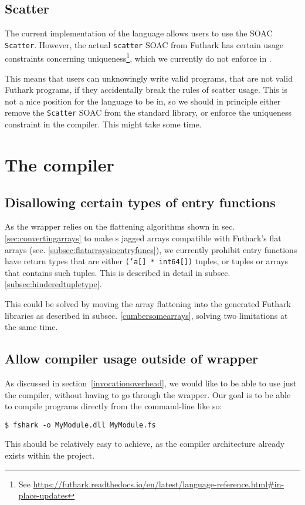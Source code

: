 \subsection{Scatter}
\label{subsec:badscatter}
The current implementation of the \fshark{} language allows users to use the
SOAC \texttt{Scatter}. However, the actual \texttt{scatter} SOAC from Futhark
has certain usage constraints concerning uniqueness\footnote{See \url{https://futhark.readthedocs.io/en/latest/language-reference.html\#in-place-updates}}, which we currently do not enforce
in \fshark{}.

This means that users can unknowingly write valid \fshark{} programs, that are
not valid Futhark programs, if they accidentally break the rules of scatter
usage. This is not a nice position for the \fshark{} language to be in, so we
should in principle either remove the \texttt{Scatter} SOAC from the \fshark{} standard
library, or enforce the uniqueness constraint in the \fshark{} compiler.
This might take some time.

\section{The \fshark{} compiler}

\subsection{Disallowing certain types of \fshark{} entry functions}
As the \fshark{} wrapper relies on the flattening algorithms shown in sec.
\ref{sec:convertingarrays} to make \fsharp{}s jagged arrays compatible with
Futhark's flat arrays (sec. \ref{subsec:flatarraysinentryfuncs}), we currently
prohibit \fshark{} entry functions have return types that are either
\texttt{('a[] * int64[])} tuples, or tuples or arrays that contains such
tuples. This is described in detail in subsec. \ref{subsec:hinderedtupletype}.

This could be solved by moving the array flattening into the generated Futhark
\csharp{} libraries as described in subsec. \ref{cumbersomearrays}, solving two
limitations at the same time.

\subsection{Allow compiler usage outside of \fshark{} wrapper}
As discussed in section~\ref{invocationoverhead}, we would like to be able to use just the \fshark{}
compiler, without having to go through the \fshark{} wrapper.
Our goal is to be able to compile \fshark{} programs directly from the
command-line like so:
\begin{verbatim}
$ fshark -o MyModule.dll MyModule.fs
\end{verbatim}
This should be relatively easy to achieve, as the compiler architecture already
exists within the \fshark{} project.

